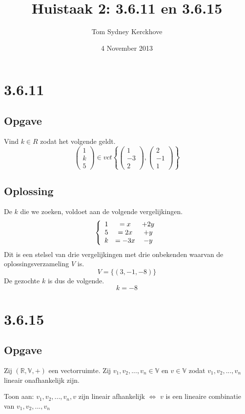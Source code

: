 \documentclass[10pt,a4paper]{article}
\title{Huistaak 2: 3.6.11 en 3.6.15}
\date{4 November 2013}
\author{Tom Sydney Kerckhove}
\begin{document}
\maketitle

\section{3.6.11}
\subsection{Opgave}
Vind $k\in R$ zodat het volgende geldt.
\[
\begin{pmatrix}
1\\k\\5
\end{pmatrix}
\in 
vct
\left\lbrace
\begin{pmatrix}
1\\-3\\2
\end{pmatrix}
,
\begin{pmatrix}
2\\-1\\1
\end{pmatrix}
\right\rbrace
\]
\subsection{Oplossing}
De $k$ die we zoeken, voldoet aan de volgende vergelijkingen.
\[
\left\lbrace
\begin{array}{c c c}
1 &= x   &+ 2y\\
5 &= 2x  &+ y\\
k &= -3x &- y\\
\end{array}
\right.
\]
Dit is een stelsel van drie vergelijkingen met drie onbekenden waarvan de oplossingsverzameling $V$ is.
\[
V = \{ (3,-1,-8) \}
\]
De gezochte $k$ is dus de volgende.
\[
k = -8
\]
\pagebreak
\section{3.6.15}
\subsection{Opgave}
Zij $(\mathbb{R},\mathbb{V},+)$ een vectorruimte.
Zij $v_1,v_2,...,v_n \in \mathbb{V}$ en $v \in \mathbb{V}$ zodat $v_1,v_2,...,v_n$ lineair onafhankelijk zijn.

Toon aan:
$v_1,v_2,...,v_n, v$ zijn lineair afhankelijk $\Leftrightarrow$ $v$ is een lineaire combinatie van $v_1,v_2,...,v_n$
\end{document}
